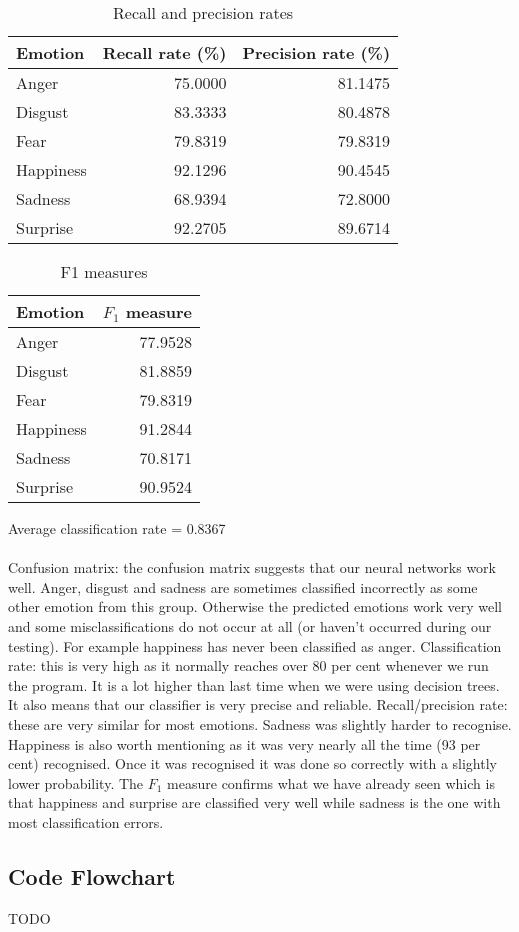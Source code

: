 \documentclass[12pt]{article}
\begin{document}
\begin{table}
\centering
\begin{tabular}{l | r r}
Emotion & Recall rate (\%) & Precision rate (\%) \\
\hline
Anger     & 75.0000 & 81.1475 \\
Disgust   & 83.3333 & 80.4878 \\
Fear      & 79.8319 & 79.8319 \\
Happiness & 92.1296 & 90.4545 \\
Sadness   & 68.9394 & 72.8000 \\
Surprise  & 92.2705 & 89.6714 \\
\end{tabular}
\caption{Recall and precision rates}
\end{table}

\begin{table}
\centering
\begin{tabular}{l | r}
Emotion & \( F_1 \) measure \\
\hline
Anger     & 77.9528 \\
Disgust   & 81.8859 \\
Fear      & 79.8319 \\
Happiness & 91.2844 \\
Sadness   & 70.8171 \\
Surprise  & 90.9524 \\
\end{tabular}
\caption{F1 measures}
\end{table}

Average classification rate = 0.8367 \\ \\
Confusion matrix: the confusion matrix suggests that our neural networks work well. Anger, disgust and sadness are sometimes classified incorrectly as some other emotion from this group. Otherwise the predicted emotions work very well and some misclassifications do not occur at all (or haven't occurred during our testing). For example happiness has never been classified as anger. Classification rate: this is very high as it normally reaches over 80 per cent whenever we run the program. It is a lot higher than last time when we were using decision trees. It also means that our classifier is very precise and reliable. Recall/precision rate: these are very similar for most emotions. Sadness was slightly harder to recognise. Happiness is also worth mentioning as it was very nearly all the time (93 per cent) recognised. Once it was recognised it was done so correctly with a slightly lower probability. The $F_1$ measure confirms what we have already seen which is that happiness and surprise are classified very well while sadness is the one with most classification errors.


\newpage
\subsection*{Code Flowchart}

TODO
\end{document}
